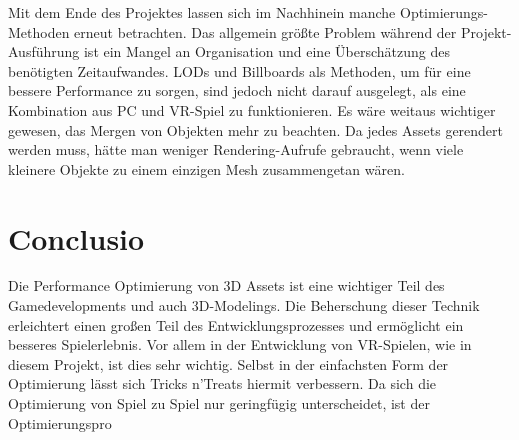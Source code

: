 Mit dem Ende des Projektes lassen sich im Nachhinein manche Optimierungs-Methoden erneut betrachten. Das allgemein größte Problem während der Projekt-Ausführung ist ein Mangel an Organisation und eine Überschätzung des benötigten Zeitaufwandes. LODs und Billboards als Methoden, um für eine bessere Performance zu sorgen, sind jedoch nicht darauf ausgelegt, als eine Kombination aus PC und VR-Spiel zu funktionieren. Es wäre weitaus wichtiger gewesen, das Mergen von Objekten mehr zu beachten. Da jedes Assets gerendert werden muss, hätte man weniger Rendering-Aufrufe gebraucht, wenn viele kleinere Objekte zu einem einzigen Mesh zusammengetan wären.\cite[S.154]{_unity_game_optimization}

\chapter{Conclusio}

Die Performance Optimierung von 3D Assets ist eine wichtiger Teil des Gamedevelopments und auch 3D-Modelings. Die Beherschung dieser Technik erleichtert einen großen Teil des Entwicklungsprozesses und ermöglicht ein besseres Spielerlebnis. Vor allem in der Entwicklung von VR-Spielen, wie in diesem Projekt, ist dies sehr wichtig. Selbst in der einfachsten Form der Optimierung lässt sich  Tricks n’Treats hiermit verbessern. Da sich die Optimierung von Spiel zu Spiel nur geringfügig unterscheidet, ist der Optimierungspro

